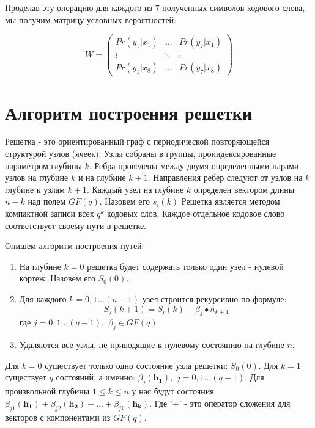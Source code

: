 \documentclass{ITaSconf}
\begin{document}
 Проделав эту операцию для каждого из 7 полученных символов кодового слова, мы получим матрицу условных вероятностей: 
 
 \begin{equation}\label{eq:probmatrix}
W = \left( \begin{array}{ccccccc}
Pr(y_1|x_1) & \dots  &  Pr(y_7|x_1) \\
\vdots        &\ddots &  \vdots \\ 
Pr(y_1|x_8) & \dots  &  Pr(y_7|x_8) \end{array} \right)  
  \end{equation}
\section{Алгоритм построения решетки}
\label{sec:trellis}

Решетка - это ориентированный граф с периодической
 повторяющейся структурой узлов (ячеек). Узлы собраны в группы, проиндексированные параметром глубины $k$. 
Ребра проведены между двумя определенными парами узлов на глубине $k$  и на глубине $k+1.$ Направления ребер следуют от узлов на $k$ глубине  к узлам $k+1.$ Каждый узел на глубине  $k$ определен  вектором длины $n-k$ над полем $GF(q).$ Назовем его  $s_i(k)$  Решетка является методом компактной записи всех $q^k$ кодовых слов. Каждое отдельное кодовое слово соответствует своему пути в решетке. 

Опишем алгоритм построения путей: 
\begin{enumerate}
 \item На глубине  $k=0$ решетка будет содержать только один узел - нулевой кортеж. Назовем его $S_0(0).$
 \item Для каждого $k=0,1...(n-1)$  узел строится рекурсивно по формуле:
\begin{equation}\label{eq:rec} 
 S_j(k+1)=S_i(k)+\beta_j\bullet h_{k+1}
 \end{equation}
 где $j=0,1...(q-1),$ $\beta_j\in GF(q)$
 \item Удаляются все узлы, не приводящие к нулевому состоянию на глубине $n.$
\end{enumerate}
 
	Для $k=0$ существует только одно состояние узла решетки: $S_0(0).$ Для $k=1$ существует $q$ состояний, а именно: $\beta_j(\mathbold{h_1}),$ $j=0,1...(q-1)$. Для произвольной глубины $1\le k\le n$ у нас будут состояния $\beta_{j1}(\mathbold{h_1})+\beta_{j2}(\mathbold{h_2})+...+\beta_{jk}(\mathbold{h_k}).$ Где '$+$' - это оператор сложения для векторов с компонентами из $GF(q).$ 
	
\end{document}
